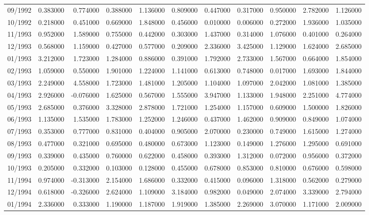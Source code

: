 \begin{tabular}{lrrrrrrrrrr}
09/1992 & 0.383000 & 0.774000 & 0.388000 & 1.136000 & 0.809000 & 0.447000 & 0.317000 & 0.950000 & 2.782000 & 1.126000 \\
10/1992 & 0.218000 & 0.451000 & 0.669000 & 1.848000 & 0.456000 & 0.010000 & 0.006000 & 0.272000 & 1.936000 & 1.035000 \\
11/1993 & 0.952000 & 1.589000 & 0.755000 & 0.442000 & 0.303000 & 1.437000 & 0.314000 & 1.076000 & 0.401000 & 0.264000 \\
12/1993 & 0.568000 & 1.159000 & 0.427000 & 0.577000 & 0.209000 & 2.336000 & 3.425000 & 1.129000 & 1.624000 & 2.685000 \\
01/1993 & 3.212000 & 1.723000 & 1.284000 & 0.886000 & 0.391000 & 1.792000 & 2.733000 & 1.567000 & 0.664000 & 1.854000 \\
02/1993 & 1.059000 & 0.550000 & 1.901000 & 1.224000 & 1.141000 & 0.613000 & 0.748000 & 0.017000 & 1.693000 & 1.844000 \\
03/1993 & 2.249000 & 4.558000 & 1.723000 & 1.481000 & 1.205000 & 1.104000 & 1.097000 & 2.042000 & 1.081000 & 1.385000 \\
04/1993 & 2.926000 & -0.076000 & 1.625000 & 0.567000 & 1.555000 & 3.947000 & 1.133000 & 1.948000 & 2.251000 & 4.774000 \\
05/1993 & 2.685000 & 0.376000 & 3.328000 & 2.878000 & 1.721000 & 1.254000 & 1.157000 & 0.609000 & 1.500000 & 1.826000 \\
06/1993 & 1.135000 & 1.535000 & 1.783000 & 1.252000 & 1.246000 & 0.437000 & 1.462000 & 0.909000 & 0.849000 & 1.074000 \\
07/1993 & 0.353000 & 0.777000 & 0.831000 & 0.404000 & 0.905000 & 2.070000 & 0.230000 & 0.749000 & 1.615000 & 1.274000 \\
08/1993 & 0.477000 & 0.321000 & 0.695000 & 0.480000 & 0.673000 & 1.123000 & 0.149000 & 1.276000 & 1.295000 & 0.691000 \\
09/1993 & 0.339000 & 0.435000 & 0.760000 & 0.622000 & 0.458000 & 0.393000 & 1.312000 & 0.072000 & 0.956000 & 0.372000 \\
10/1993 & 0.205000 & 0.332000 & 0.103000 & 0.128000 & 0.455000 & 0.678000 & 0.853000 & 0.810000 & 0.676000 & 0.598000 \\
11/1994 & 0.974000 & -0.313000 & 2.154000 & 1.686000 & 0.332000 & 0.415000 & 0.096000 & 1.318000 & 0.562000 & 0.279000 \\
12/1994 & 0.618000 & -0.326000 & 2.624000 & 1.109000 & 3.184000 & 0.982000 & 0.049000 & 2.074000 & 3.339000 & 2.794000 \\
01/1994 & 2.336000 & 0.333000 & 1.190000 & 1.187000 & 1.919000 & 1.385000 & 2.269000 & 3.070000 & 1.171000 & 2.009000 \\

\end{tabular}

